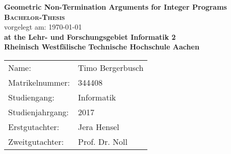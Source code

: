 \begin{titlepage}
	\begin{center}
		\huge \textbf{\textsf{Geometric Non-Termination Arguments for Integer Programs}} \\
		\vspace{2cm}
		\LARGE\textbf{\textsc{Bachelor-Thesis}}\\
		\vspace{1cm}
		\normalsize
		vorgelegt am: \today \\
		\vspace{2.5cm}
		\large \textbf{at the Lehr- und Forschungsgebiet Informatik 2}\\
		\large \textbf{Rheinisch Westfälische Technische Hochschule Aachen}\\
		\vspace{3cm}
	\end{center}
	\normalsize{
		\begin{tabular}{ll}
			Name: & {Timo Bergerbusch} \\
			Matrikelnummer: & {344408} \\
			Studiengang: & Informatik\\
			Studienjahrgang: & 2017\\
			Erstgutachter: & {Jera Hensel} \\
			Zweitgutachter: & {Prof. Dr. Noll} \\
		\end{tabular}\\
	}
\end{titlepage}
